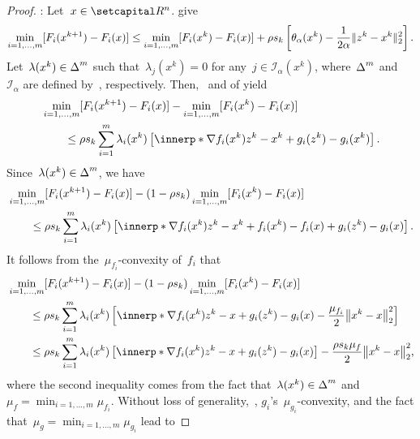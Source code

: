 \documentclass[../../main]{subfiles}
\begin{document}
\begin{proof}
    :
    Let~$x \in \setR^n$.
     give
    \begin{equation}
        \min_{i = 1, \dots, m} [F_i(x^{k + 1}) - F_i(x)] \le \min_{i = 1, \dots, m} [F_i(x^k) - F_i(x)] + \rho s_k \left[ \theta_\alpha(x^k) - \frac{1}{2 \alpha} \lVert z^k - x^k\rVert_2^2 \right]
    .\end{equation} 
    Let~$\lambda(x^k) \in \operatorname{\Delta}^m$ such that~$\lambda_j(x^k) = 0$ for any~$j \in \mathcal{I}_\alpha(x^k)$, where~$\operatorname{\Delta}^m$ and~$\mathcal{I}_\alpha$ are defined by~, respectively.
    Then,~ and  of  yield
    \begin{align}
        \MoveEqLeft \min_{i = 1, \dots, m} [F_i(x^{k + 1}) - F_i(x)] - \min_{i = 1, \dots, m} [F_i(x^k) - F_i(x)] \\
        &\le \rho s_k \sum_{i = 1}^{m} \lambda_i(x^k) \left[ \innerp*{\nabla f_i(x^k)}{z^k - x^k} + g_i(z^k) - g_i(x^k) \right]
    .\end{align} 
    Since~$\lambda(x^k) \in \operatorname{\Delta}^m$, we have
    \begin{align}
        \MoveEqLeft \min_{i = 1, \dots, m} [F_i(x^{k + 1}) - F_i(x)] - (1 - \rho s_k) \min_{i = 1, \dots, m}[F_i(x^k) - F_i(x)] \\
             &\le \rho s_k \sum_{i = 1}^{m} \lambda_i(x^k) \left[ \innerp*{\nabla f_i(x^k)}{z^k - x^k} + f_i(x^k) - f_i(x) + g_i(z^k) - g_i(x) \right]
    .\end{align} 
    It follows from the~$\mu_{f_i}$-convexity of~$f_i$ that
    \begin{align}
        \MoveEqLeft \min_{i = 1, \dots, m} [F_i(x^{k + 1}) - F_i(x)] - (1 - \rho s_k) \min_{i = 1, \dots, m}[F_i(x^k) - F_i(x)] \\
             &\le \rho s_k \sum_{i = 1}^{m} \lambda_i(x^k) \left[ \innerp*{\nabla f_i(x^k)}{z^k - x} + g_i(z^k) - g_i(x) - \frac{\mu_{f_i}}{2} \norm*{x^k - x}_2^2 \right] \\
             &\le \rho s_k \sum_{i = 1}^{m} \lambda_i(x^k) \left[ \innerp*{\nabla f_i(x^k)}{z^k - x} + g_i(z^k) - g_i(x) \right] - \frac{\rho s_k \mu_f}{2} \norm*{x^k - x}_2^2
    ,\end{align} 
    where the second inequality comes from the fact that~$\lambda(x^k) \in \operatorname{\Delta}^m$ and~$\mu_f = \min_{i = 1, \dots, m} \mu_{f_i}$.
    Without loss of generality,~, $g_i$'s~$\mu_{g_i}$-convexity, and the fact that~$\mu_g = \min_{i = 1, \dots, m} \mu_{g_i}$ lead to

\end{proof}
\end{document}
